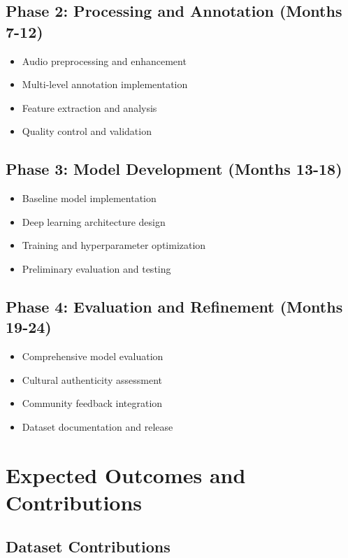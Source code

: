 \documentclass[12pt]{article}
\begin{document}
\subsection{Phase 2: Processing and Annotation (Months 7-12)}
\begin{itemize}
    \item Audio preprocessing and enhancement
    \item Multi-level annotation implementation
    \item Feature extraction and analysis
    \item Quality control and validation
\end{itemize}

\subsection{Phase 3: Model Development (Months 13-18)}
\begin{itemize}
    \item Baseline model implementation
    \item Deep learning architecture design
    \item Training and hyperparameter optimization
    \item Preliminary evaluation and testing
\end{itemize}

\subsection{Phase 4: Evaluation and Refinement (Months 19-24)}
\begin{itemize}
    \item Comprehensive model evaluation
    \item Cultural authenticity assessment
    \item Community feedback integration
    \item Dataset documentation and release
\end{itemize}

\section{Expected Outcomes and Contributions}

\subsection{Dataset Contributions}
\end{document}
